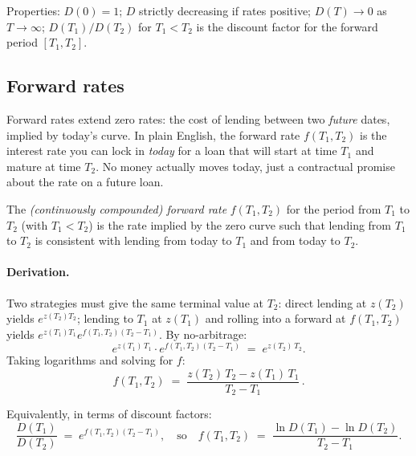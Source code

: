 Properties: $D(0) = 1$; $D$ strictly decreasing if rates positive;
$D(T) \to 0$ as $T \to \infty$; $D(T_1)/D(T_2)$ for $T_1 < T_2$ is
the discount factor for the forward period $[T_1, T_2]$.

\subsection{Forward rates}

Forward rates extend zero rates: the cost of lending between two
\emph{future} dates, implied by today's curve.  In plain English, the
forward rate $f(T_1,T_2)$ is the interest rate you can lock in
\emph{today} for a loan that will start at time $T_1$ and mature at
time $T_2$.  No money actually moves today, just a contractual
promise about the rate on a future loan.

\begin{definition}
\label{def:forward_rate}
The \emph{(continuously compounded) forward rate} $f(T_1, T_2)$ for
the period from $T_1$ to $T_2$ (with $T_1 < T_2$) is the rate implied
by the zero curve such that lending from $T_1$ to $T_2$ is
consistent with lending from today to $T_1$ and from today to $T_2$.
\end{definition}

\paragraph{Derivation.}
Two strategies must give the same terminal value at $T_2$:
direct lending at $z(T_2)$ yields $e^{z(T_2)T_2}$; lending to $T_1$ at
$z(T_1)$ and rolling into a forward at $f(T_1,T_2)$ yields
$e^{z(T_1)T_1} e^{f(T_1,T_2)(T_2-T_1)}$.  By no-arbitrage:
\begin{equation}
  e^{z(T_1)\,T_1} \cdot e^{f(T_1,T_2)(T_2 - T_1)}
  \;=\; e^{z(T_2)\,T_2}.
  \label{eq:forward_no_arb}
\end{equation}
Taking logarithms and solving for $f$:
\begin{equation}
  \boxed{f(T_1, T_2)
    \;=\; \frac{z(T_2)\,T_2 - z(T_1)\,T_1}{T_2 - T_1}}\,.
  \label{eq:forward_rate}
\end{equation}

Equivalently, in terms of discount factors:
\begin{equation}
  \frac{D(T_1)}{D(T_2)}
  \;=\; e^{f(T_1,T_2)(T_2 - T_1)},
  \quad\text{so}\quad
  f(T_1,T_2) \;=\;
  \frac{\ln D(T_1) - \ln D(T_2)}{T_2 - T_1}.
  \label{eq:forward_from_D}
\end{equation}

